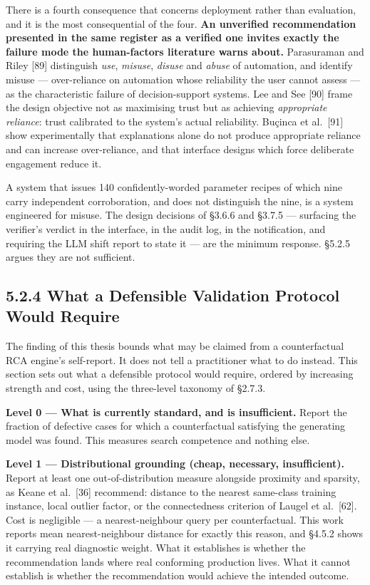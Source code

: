 There is a fourth consequence that concerns deployment rather than evaluation, and it is the most consequential of the four. \textbf{An unverified recommendation presented in the same register as a verified one invites exactly the failure mode the human-factors literature warns about.} Parasuraman and Riley {[}89{]} distinguish \emph{use}, \emph{misuse}, \emph{disuse} and \emph{abuse} of automation, and identify misuse --- over-reliance on automation whose reliability the user cannot assess --- as the characteristic failure of decision-support systems. Lee and See {[}90{]} frame the design objective not as maximising trust but as achieving \emph{appropriate reliance}: trust calibrated to the system's actual reliability. Buçinca et al.~{[}91{]} show experimentally that explanations alone do not produce appropriate reliance and can increase over-reliance, and that interface designs which force deliberate engagement reduce it.

A system that issues 140 confidently-worded parameter recipes of which nine carry independent corroboration, and does not distinguish the nine, is a system engineered for misuse. The design decisions of §3.6.6 and §3.7.5 --- surfacing the verifier's verdict in the interface, in the audit log, in the notification, and requiring the LLM shift report to state it --- are the minimum response. §5.2.5 argues they are not sufficient.

\hypertarget{what-a-defensible-validation-protocol-would-require}{%
\subsection{5.2.4 What a Defensible Validation Protocol Would Require}\label{what-a-defensible-validation-protocol-would-require}}

The finding of this thesis bounds what may be claimed from a counterfactual RCA engine's self-report. It does not tell a practitioner what to do instead. This section sets out what a defensible protocol would require, ordered by increasing strength and cost, using the three-level taxonomy of §2.7.3.

\textbf{Level 0 --- What is currently standard, and is insufficient.} Report the fraction of defective cases for which a counterfactual satisfying the generating model was found. This measures search competence and nothing else.

\textbf{Level 1 --- Distributional grounding (cheap, necessary, insufficient).} Report at least one out-of-distribution measure alongside proximity and sparsity, as Keane et al.~{[}36{]} recommend: distance to the nearest same-class training instance, local outlier factor, or the connectedness criterion of Laugel et al.~{[}62{]}. Cost is negligible --- a nearest-neighbour query per counterfactual. This work reports mean nearest-neighbour distance for exactly this reason, and §4.5.2 shows it carrying real diagnostic weight. What it establishes is whether the recommendation lands where real conforming production lives. What it cannot establish is whether the recommendation would achieve the intended outcome.

